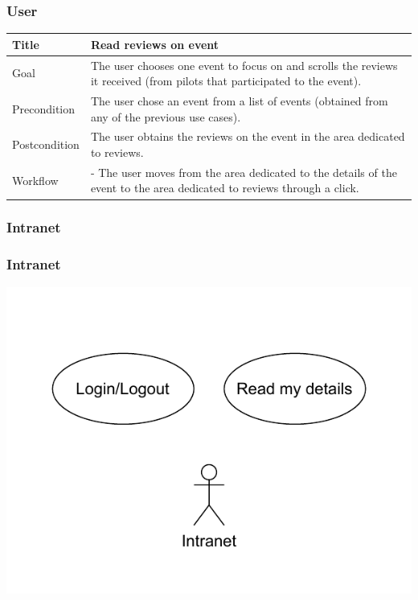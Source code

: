 \documentclass{beamer}
\begin{document}


\begin{frame}
    \frametitle{User}
    \begin{table}
        \tiny
        \begin{tabular}{|p{2cm}|p{6cm}|}
        \hline  
        Title & \textbf{Read reviews on event} \\
        \hline
        Goal & The user chooses one event to focus on and scrolls the reviews it received (from pilots that 
        participated to the event). \\
        \hline
        Precondition & The user chose an event from a list of events (obtained from any of the previous use cases).\\
        \hline
        Postcondition & The user obtains the reviews on the event in the area dedicated to reviews. \\
        \hline
        Workflow &
        - The user moves from the area dedicated to the details of the event to the
        area dedicated to reviews through a click. \\
        \hline
        \end{tabular}
\end{table}
\end{frame}





% 
% 
% 
% 
% 
% 
% 
% 

\subsubsection{Intranet}

\begin{frame}
    \frametitle{Intranet}
    \centering
    \includegraphics[width=0.7\linewidth]{drawio/intranet.pdf}
\end{frame}
\end{document}
